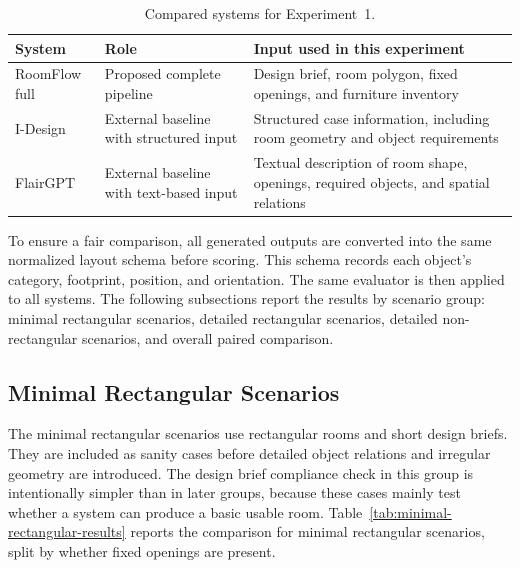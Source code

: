 \begingroup
\small
\setlength{\tabcolsep}{4pt}
\renewcommand{\arraystretch}{1.15}
\begin{xltabular}{\textwidth}{|>{\raggedright\arraybackslash}p{0.18\textwidth}|>{\raggedright\arraybackslash}p{0.25\textwidth}|>{\raggedright\arraybackslash}X|}
\caption{Compared systems for Experiment~1.}\label{tab:external-compared-systems}\\
\hline
\textbf{System} & \textbf{Role} & \textbf{Input used in this experiment} \\
\hline
RoomFlow full & Proposed complete pipeline & Design brief, room polygon, fixed openings, and furniture inventory \\
\hline
I-Design & External baseline with structured input & Structured case information, including room geometry and object requirements \\
\hline
FlairGPT & External baseline with text-based input & Textual description of room shape, openings, required objects, and spatial relations \\
\hline
\end{xltabular}
\endgroup

To ensure a fair comparison, all generated outputs are converted into the same normalized layout schema before scoring. This schema records each object's category, footprint, position, and orientation. The same evaluator is then applied to all systems. The following subsections report the results by scenario group: minimal rectangular scenarios, detailed rectangular scenarios, detailed non-rectangular scenarios, and overall paired comparison.

\subsection{Minimal Rectangular Scenarios}

The minimal rectangular scenarios use rectangular rooms and short design briefs. They are included as sanity cases before detailed object relations and irregular geometry are introduced. The design brief compliance check in this group is intentionally simpler than in later groups, because these cases mainly test whether a system can produce a basic usable room. Table~\ref{tab:minimal-rectangular-results} reports the comparison for minimal rectangular scenarios, split by whether fixed openings are present.

